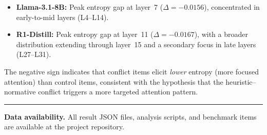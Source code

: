 \documentclass{article}
\begin{document}
\begin{itemize}[leftmargin=*,itemsep=2pt]
  \item \textbf{Llama-3.1-8B:} Peak entropy gap at layer~7
  ($\Delta = -0.0156$), concentrated in early-to-mid layers
  (L4--L14).
  \item \textbf{R1-Distill:} Peak entropy gap at layer~11
  ($\Delta = -0.0167$), with a broader distribution extending
  through layer~15 and a secondary focus in late layers (L27--L31).
\end{itemize}

\noindent The negative sign indicates that conflict items elicit
\emph{lower} entropy (more focused attention) than control items,
consistent with the hypothesis that the heuristic--normative conflict
triggers a more targeted attention pattern.

\vspace{1em}
\hrule
\vspace{0.5em}
\noindent\small\textbf{Data availability.}  All result JSON files,
analysis scripts, and benchmark items are available at the project
repository.




\end{document}

